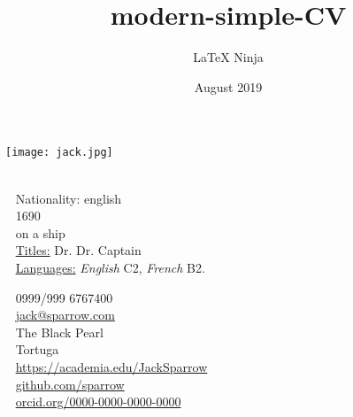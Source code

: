 \documentclass{modernsimplecv}
\title{modern-simple-CV}
\author{\LaTeX{} Ninja}
\date{August 2019}
\begin{document}
\thispagestyle{empty}




\begin{minipage}[t]{0.21\textwidth}
\vspace{0pt} %
\texttt{[image: jack.jpg]}\hspace{1em}
\end{minipage}
\hfill
\begin{minipage}[t]{0.77\textwidth}
\vspace{0pt} %
\begin{shaded*}

\begin{minipage}[t]{0.4\textwidth}
\vspace{0pt} %
{\par\centering\huge{}} \\[0.3cm]
\faGlobe~ Nationality: english\\
\faBirthdayCake~ 1690 \\
\faMapMarker~ on a ship \\

{\small
\faGraduationCap~ \underline{Titles:} Dr. Dr. Captain \\
\faCommentsO~ \underline{Languages:} \emph{English} C2, \emph{French} B2.}
\end{minipage}\hfill
\begin{minipage}[t]{0.55\textwidth}
\vspace{0pt} %
\faPhone~ 0999/999 6767400 \\
\faAt~ \protect\url{jack@sparrow.com} \\

\faEnvelopeO~ The Black Pearl \\ 
\faMapMarker~ Tortuga \\

\faFont~ \protect\url{https://academia.edu/JackSparrow} \\
\faGithub~ \protect\url{github.com/sparrow} \\
\faCircle~ \protect\url{orcid.org/0000-0000-0000-0000} \\
\end{minipage}
\hfill
\end{shaded*}
\end{minipage}\\[15pt]
\end{document}

